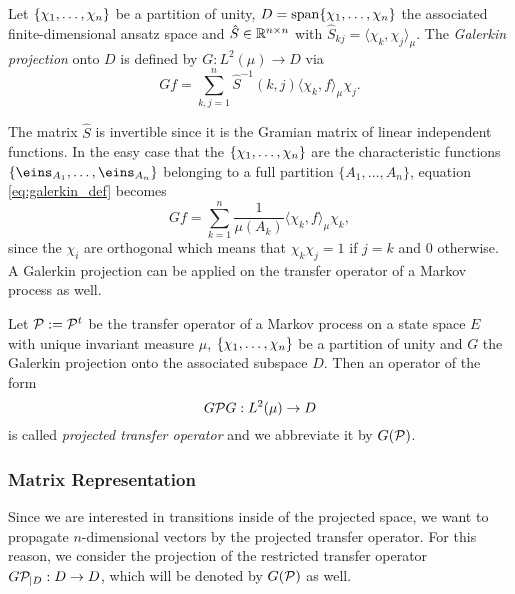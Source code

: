 \begin{defi}
Let $\{ \chi_1,\dots,\chi_n \}$ be a partition of unity, $D = \mathrm{span}\{\chi_1,\dots,\chi_n\}$ the associated finite-dimensional ansatz space and $\hat{S} \in \mathbb{R}^{n\times n}$ with $\hat{S}_{kj} = \langle \chi_k, \chi_j \rangle_\mu$. The \textit{Galerkin projection} onto $D$ is defined by $G: L^2 (\mu) \rightarrow D$ via
\begin{equation}
\label{eq:galerkin_def}
G f = \sum_{k,j=1}^n \hat{S}^{-1}(k,j) \langle \chi_k, f \rangle_\mu \chi_j.
\end{equation}
\end{defi}

The matrix $\hat{S}$ is invertible since it is the Gramian matrix of linear independent functions.
In the easy case that the $\{\chi_1,\dots,\chi_n\}$ are the characteristic functions $\{\eins_{A_1},\dots,\eins_{A_n}\}$ belonging to a full partition $\{A_1,\dots,A_n\}$, equation \eqref{eq:galerkin_def} becomes
\begin{equation*}
G f = \sum_{k=1}^n \frac{1}{\mu(A_k)} \langle \chi_k, f \rangle_\mu \chi_k,
\end{equation*}
since the $\chi_i$ are orthogonal which means that $\chi_k \chi_j = 1$ if $j=k$ and $0$ otherwise.
A Galerkin projection can be applied on the transfer operator of a Markov process as well.

\begin{defi}
Let $\mathcal{P} := \mathcal{P}^t$ be the transfer operator of a Markov process on a state space $E$ with unique invariant measure $\mu$, $\{ \chi_1,\dots,\chi_n \}$ be a partition of unity and $G$ the Galerkin projection onto the associated subspace $D$. Then an operator of the form
\begin{equation*}
G \mathcal{P} G: L^2 (\mu) \rightarrow D
\end{equation*}
is called \textit{projected transfer operator} and we abbreviate it by $G(\mathcal{P})$.
\end{defi}

\subsubsection*{Matrix Representation}

Since we are interested in transitions inside of the projected space, we want to propagate $n$-dimensional vectors by the projected transfer operator. For this reason, we consider the projection of the restricted transfer operator $G\mathcal{P}_{\mid D} : D \rightarrow D$, which will be denoted by $G(\mathcal{P})$ as well.

